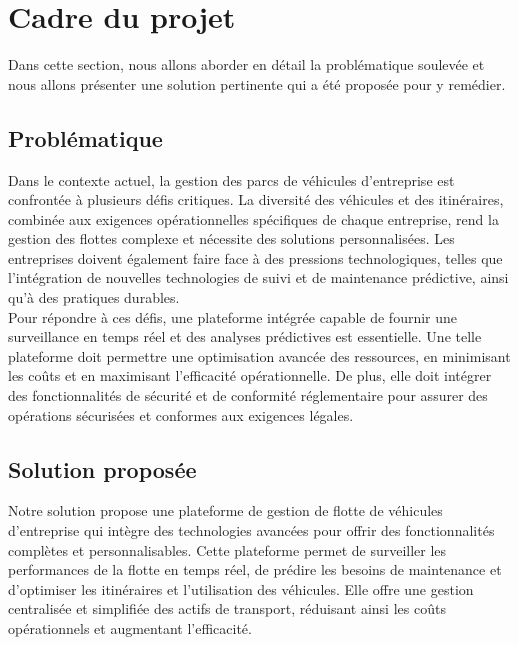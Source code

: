 \section{Cadre du projet}
\bigskip
Dans cette section, nous allons aborder en détail la problématique soulevée et nous allons présenter une solution pertinente qui a été proposée pour y remédier.
\bigskip
\subsection{ Problématique}
\bigskip
Dans le contexte actuel, la gestion des parcs de véhicules d’entreprise est confrontée à plusieurs défis critiques. La diversité des véhicules et des itinéraires, combinée aux exigences opérationnelles spécifiques de chaque entreprise, rend la gestion des flottes complexe et nécessite des solutions personnalisées. Les entreprises doivent également faire face à des pressions technologiques, telles que l’intégration de nouvelles technologies de suivi et de maintenance prédictive, ainsi qu'à des pratiques durables.\\

Pour répondre à ces défis, une plateforme intégrée capable de fournir une surveillance en temps réel et des analyses prédictives est essentielle. Une telle plateforme doit permettre une optimisation avancée des ressources, en minimisant les coûts et en maximisant l’efficacité opérationnelle. De plus, elle doit intégrer des fonctionnalités de sécurité et de conformité réglementaire pour assurer des opérations sécurisées et conformes aux exigences légales.




\subsection{ Solution proposée}
\bigskip
Notre solution propose une plateforme de gestion de flotte de véhicules d’entreprise qui intègre des technologies avancées pour offrir des fonctionnalités complètes et personnalisables. Cette plateforme permet de surveiller les performances de la flotte en temps réel, de prédire les besoins de maintenance et d’optimiser les itinéraires et l’utilisation des véhicules. Elle offre une gestion centralisée et simplifiée des actifs de transport, réduisant ainsi les coûts opérationnels et augmentant l’efficacité.\\

